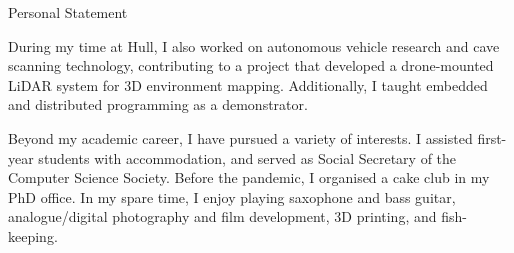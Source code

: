 \documentclass{cv}
\begin{document}
\begin{rSection}{Personal Statement}
        \item During my time at Hull, I also worked on autonomous vehicle research and cave scanning technology, contributing to a project that developed a drone-mounted LiDAR system for 3D environment mapping. Additionally, I taught embedded and distributed programming as a demonstrator.

        \item Beyond my academic career, I have pursued a variety of interests. I assisted first-year students with accommodation, and served as Social Secretary of the Computer Science Society. Before the pandemic, I organised a cake club in my PhD office. In my spare time, I enjoy playing saxophone and bass guitar, analogue/digital photography and film development, 3D printing, and fish-keeping.
    \end{rSection}

    \newpage
    
\end{document}
